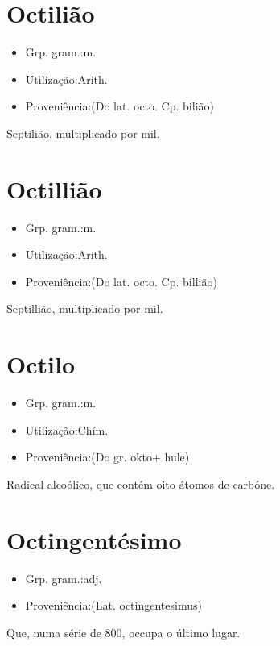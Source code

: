 \section{Octilião}
\begin{itemize}
\item {Grp. gram.:m.}
\end{itemize}
\begin{itemize}
\item {Utilização:Arith.}
\end{itemize}
\begin{itemize}
\item {Proveniência:(Do lat. \textunderscore octo\textunderscore . Cp. \textunderscore bilião\textunderscore )}
\end{itemize}
Septilião, multiplicado por mil.
\section{Octillião}
\begin{itemize}
\item {Grp. gram.:m.}
\end{itemize}
\begin{itemize}
\item {Utilização:Arith.}
\end{itemize}
\begin{itemize}
\item {Proveniência:(Do lat. \textunderscore octo\textunderscore . Cp. \textunderscore billião\textunderscore )}
\end{itemize}
Septillião, multiplicado por mil.
\section{Octilo}
\begin{itemize}
\item {Grp. gram.:m.}
\end{itemize}
\begin{itemize}
\item {Utilização:Chím.}
\end{itemize}
\begin{itemize}
\item {Proveniência:(Do gr. \textunderscore okto\textunderscore  + \textunderscore hule\textunderscore )}
\end{itemize}
Radical alcoólico, que contém oito átomos de carbóne.
\section{Octingentésimo}
\begin{itemize}
\item {Grp. gram.:adj.}
\end{itemize}
\begin{itemize}
\item {Proveniência:(Lat. \textunderscore octingentesimus\textunderscore )}
\end{itemize}
Que, numa série de 800, occupa o último lugar.
